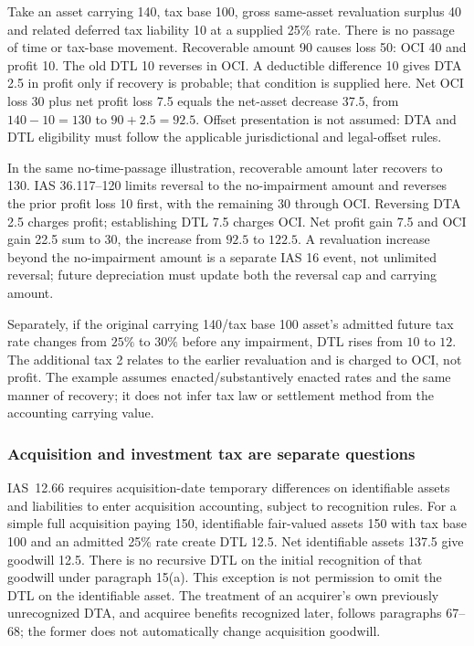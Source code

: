 Take an asset carrying 140, tax base 100, gross same-asset revaluation surplus 40 and related deferred tax liability 10 at a supplied 25\% rate. There is no passage of time or tax-base movement. Recoverable amount 90 causes loss 50: OCI 40 and profit 10. The old DTL 10 reverses in OCI. A deductible difference 10 gives DTA 2.5 in profit only if recovery is probable; that condition is supplied here. Net OCI loss 30 plus net profit loss 7.5 equals the net-asset decrease 37.5, from \(140 - 10 = 130\) to \(90 + 2.5 = 92.5\). Offset presentation is not assumed: DTA and DTL eligibility must follow the applicable jurisdictional and legal-offset rules.

In the same no-time-passage illustration, recoverable amount later recovers to 130. IAS 36.117--120 limits reversal to the no-impairment amount and reverses the prior profit loss 10 first, with the remaining 30 through OCI. Reversing DTA 2.5 charges profit; establishing DTL 7.5 charges OCI. Net profit gain 7.5 and OCI gain 22.5 sum to 30, the increase from \(92.5\) to \(122.5\). A revaluation increase beyond the no-impairment amount is a separate IAS 16 event, not unlimited reversal; future depreciation must update both the reversal cap and carrying amount.

Separately, if the original carrying 140/tax base 100 asset's admitted future tax rate changes from \(25\%\) to \(30\%\) before any impairment, DTL rises from \(10\) to \(12\). The additional tax 2 relates to the earlier revaluation and is charged to OCI, not profit. The example assumes enacted/substantively enacted rates and the same manner of recovery; it does not infer tax law or settlement method from the accounting carrying value.

\hypertarget{acquisition-and-investment-tax-are-separate-questions}{%
\subsubsection{Acquisition and investment tax are separate questions}\label{acquisition-and-investment-tax-are-separate-questions}}

IAS~12.66 \citep[IAS~12.39--51,66--68]{eu20231803} requires acquisition-date temporary differences on identifiable assets and liabilities to enter acquisition accounting, subject to recognition rules. For a simple full acquisition paying 150, identifiable fair-valued assets 150 with tax base 100 and an admitted 25\% rate create DTL 12.5. Net identifiable assets 137.5 give goodwill 12.5. There is no recursive DTL on the initial recognition of that goodwill under paragraph 15(a). This exception is not permission to omit the DTL on the identifiable asset. The treatment of an acquirer's own previously unrecognized DTA, and acquiree benefits recognized later, follows paragraphs 67--68; the former does not automatically change acquisition goodwill.

